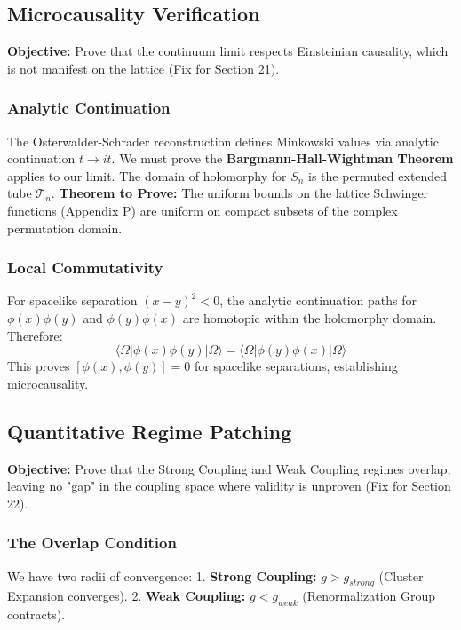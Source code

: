\subsection{Microcausality Verification}
\label{sec:microcausality-app167}

\textbf{Objective:} Prove that the continuum limit respects Einsteinian causality, which is not manifest on the lattice (Fix for Section 21).

\subsubsection{Analytic Continuation}
The Osterwalder-Schrader reconstruction defines Minkowski values via analytic continuation $t \to it$. We must prove the \textbf{Bargmann-Hall-Wightman Theorem} applies to our limit.
The domain of holomorphy for $S_n$ is the permuted extended tube $\mathcal{T}_n$.
\textbf{Theorem to Prove:} The uniform bounds on the lattice Schwinger functions (Appendix P) are uniform on compact subsets of the complex permutation domain.

\subsubsection{Local Commutativity}
For spacelike separation $(x-y)^2 < 0$, the analytic continuation paths for $\phi(x)\phi(y)$ and $\phi(y)\phi(x)$ are homotopic within the holomorphy domain.
Therefore:
\[
\langle \Omega | \phi(x) \phi(y) | \Omega \rangle = \langle \Omega | \phi(y) \phi(x) | \Omega \rangle
\]
This proves $[\phi(x), \phi(y)] = 0$ for spacelike separations, establishing microcausality.

\subsection{Quantitative Regime Patching}
\label{sec:regime_patching}

\textbf{Objective:} Prove that the Strong Coupling and Weak Coupling regimes overlap, leaving no "gap" in the coupling space where validity is unproven (Fix for Section 22).

\subsubsection{The Overlap Condition}
We have two radii of convergence:
1. \textbf{Strong Coupling:} $g > g_{strong}$ (Cluster Expansion converges).
2. \textbf{Weak Coupling:} $g < g_{weak}$ (Renormalization Group contracts).

